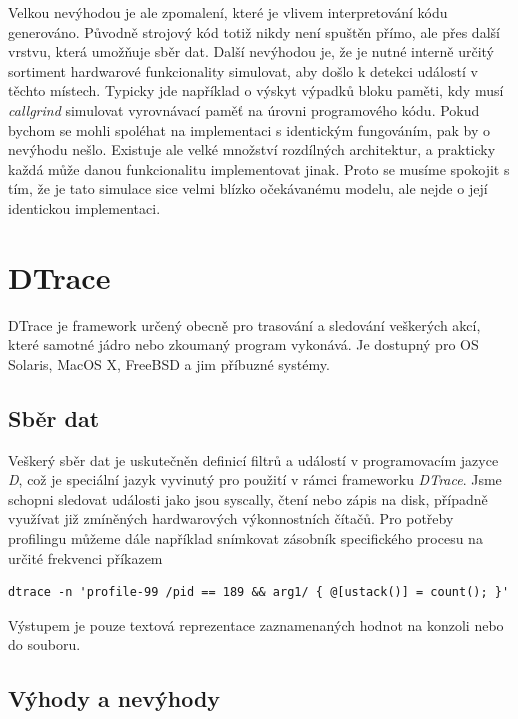 \documentclass[czech,BP]{thesiskiv}
\begin{document}
Velkou nevýhodou je ale zpomalení, které je vlivem interpretování kódu generováno. Původně strojový kód totiž nikdy není spuštěn přímo, ale přes další vrstvu, která umožňuje sběr dat. Další nevýhodou je, že je nutné interně určitý sortiment hardwarové funkcionality simulovat, aby došlo k detekci událostí v těchto místech. Typicky jde například o výskyt výpadků bloku paměti, kdy musí \emph{callgrind} simulovat vyrovnávací paměť na úrovni programového kódu. Pokud bychom se mohli spoléhat na implementaci s identickým fungováním, pak by o nevýhodu nešlo. Existuje ale velké množství rozdílných architektur, a prakticky každá může danou funkcionalitu implementovat jinak. Proto se musíme spokojit s tím, že je tato simulace sice velmi blízko očekávanému modelu, ale nejde o její identickou implementaci.




\section{DTrace}

DTrace je framework určený obecně pro trasování a sledování veškerých akcí, které samotné jádro nebo zkoumaný program vykonává. Je dostupný pro OS Solaris, MacOS X, FreeBSD a jim příbuzné systémy.

\subsection*{Sběr dat}

Veškerý sběr dat je uskutečněn definicí filtrů a událostí v programovacím jazyce \emph{D}, což je speciální jazyk vyvinutý pro použití v rámci frameworku \emph{DTrace}. Jsme schopni sledovat události jako jsou syscally, čtení nebo zápis na disk, případně využívat již zmíněných hardwarových výkonnostních čítačů. Pro potřeby profilingu můžeme dále například snímkovat zásobník specifického procesu na určité frekvenci příkazem

\lstset{escapechar=@,style=custombash}
\begin{lstlisting}
dtrace -n 'profile-99 /pid == 189 && arg1/ { @[ustack()] = count(); }'
\end{lstlisting}

Výstupem je pouze textová reprezentace zaznamenaných hodnot na konzoli nebo do souboru.

\subsection*{Výhody a nevýhody}
\end{document}

